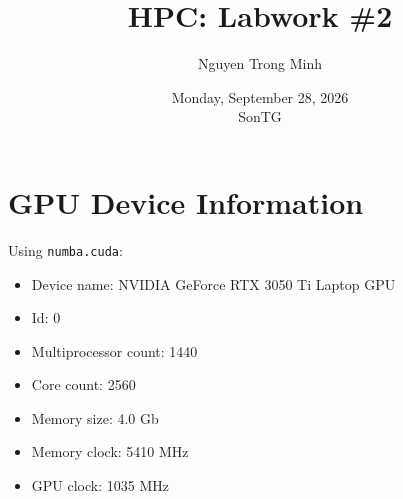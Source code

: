 \documentclass{article}
\title{HPC: Labwork \#2}
\author{Nguyen Trong Minh}
\date{Monday, September 28, 2026 \\ SonTG}
\begin{document}
\maketitle

\section{GPU Device Information}

Using \texttt{numba.cuda}:

\begin{itemize}
  \item Device name: NVIDIA GeForce RTX 3050 Ti Laptop GPU
  \item Id: 0
  \item Multiprocessor count: 1440
  \item Core count: 2560
  \item Memory size: 4.0 Gb
  \item Memory clock: 5410 MHz
  \item GPU clock: 1035 MHz
\end{itemize}
\end{document}
